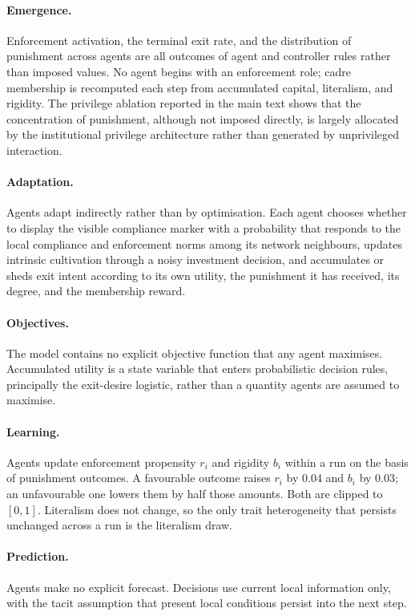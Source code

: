 \documentclass[12pt]{article}
\begin{document}
\paragraph{Emergence.} Enforcement activation, the terminal exit rate, and the
distribution of punishment across agents are all outcomes of agent and
controller rules rather than imposed values. No agent begins with an
enforcement role; cadre membership is recomputed each step from accumulated
capital, literalism, and rigidity. The privilege ablation reported in the main
text shows that the concentration of punishment, although not imposed directly,
is largely allocated by the institutional privilege architecture rather than
generated by unprivileged interaction.

\paragraph{Adaptation.} Agents adapt indirectly rather than by optimisation.
Each agent chooses whether to display the visible compliance marker with a
probability that responds to the local compliance and enforcement norms among
its network neighbours, updates intrinsic cultivation through a noisy
investment decision, and accumulates or sheds exit intent according to its own
utility, the punishment it has received, its degree, and the membership reward.

\paragraph{Objectives.} The model contains no explicit objective function that
any agent maximises. Accumulated utility is a state variable that enters
probabilistic decision rules, principally the exit-desire logistic, rather than
a quantity agents are assumed to maximise.

\paragraph{Learning.} Agents update enforcement propensity $r_i$ and rigidity
$b_i$ within a run on the basis of punishment outcomes. A favourable outcome
raises $r_i$ by 0.04 and $b_i$ by 0.03; an unfavourable one lowers them by half
those amounts. Both are clipped to $[0,1]$. Literalism does not change, so the
only trait heterogeneity that persists unchanged across a run is the literalism
draw.

\paragraph{Prediction.} Agents make no explicit forecast. Decisions use current
local information only, with the tacit assumption that present local conditions
persist into the next step.
\end{document}
